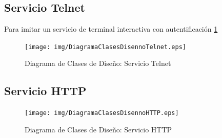 \documentclass[a4paper,spanish,12pt]{book}
\begin{document}
\subsection{Servicio Telnet}
Para imitar un servicio de terminal interactiva con autentificación 
			  \ref{fig:DiagramaClasesDisennoTelnet}
\begin{figure}[h!]
		\begin{center}
				\texttt{[image: img/DiagramaClasesDisennoTelnet.eps]}	
			\end{center}
			\caption{Diagrama de Clases de Diseño: Servicio Telnet}
			  \label{fig:DiagramaClasesDisennoTelnet}
\end{figure}

\subsection{Servicio HTTP}

\begin{figure}[h!]
		\begin{center}
				\texttt{[image: img/DiagramaClasesDisennoHTTP.eps]}	
			\end{center}
			\caption{Diagrama de Clases de Diseño: Servicio HTTP}
			  \label{fig:DiagramaClasesDisennoHTTP}
\end{figure}
\end{document}
